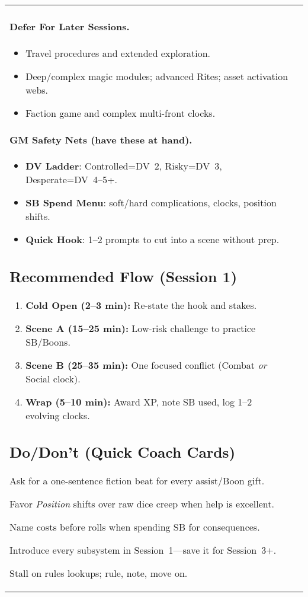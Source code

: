 \begin{tabularx}{\linewidth}{>{\bfseries}l X}
\paragraph{Defer For Later Sessions.}
\begin{itemize}
  \item Travel procedures and extended exploration.
  \item Deep/complex magic modules; advanced Rites; asset activation webs.
  \item Faction game and complex multi-front clocks.
\end{itemize}

\paragraph{GM Safety Nets (have these at hand).}
\begin{itemize}
  \item \textbf{DV Ladder}: Controlled=DV~2, Risky=DV~3, Desperate=DV~4–5+.
  \item \textbf{SB Spend Menu}: soft/hard complications, clocks, position shifts.
  \item \textbf{Quick Hook}: 1–2 prompts to cut into a scene without prep.
\end{itemize}

\subsection*{Recommended Flow (Session 1)}
\begin{enumerate}
  \item \textbf{Cold Open (2–3 min):} Re-state the hook and stakes.
  \item \textbf{Scene A (15–25 min):} Low-risk challenge to practice SB/Boons.
  \item \textbf{Scene B (25–35 min):} One focused conflict (Combat \emph{or} Social clock).
  \item \textbf{Wrap (5–10 min):} Award XP, note SB used, log 1–2 evolving clocks.
\end{enumerate}

\subsection*{Do/Don’t (Quick Coach Cards)}
\begin{description}[leftmargin=1.6em]
  \item[\textbf{Do}] Ask for a one-sentence fiction beat for every assist/Boon gift.
  \item[\textbf{Do}] Favor \emph{Position} shifts over raw dice creep when help is excellent.
  \item[\textbf{Do}] Name costs before rolls when spending SB for consequences.
  \item[\textbf{Don’t}] Introduce every subsystem in Session~1—save it for Session~3+.
  \item[\textbf{Don’t}] Stall on rules lookups; rule, note, move on.
\end{description}


\end{tabularx}
